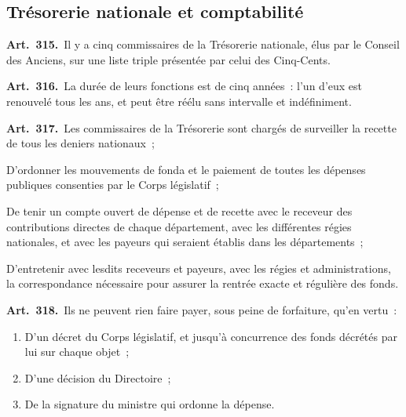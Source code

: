 \documentclass[french,twoside]{book} %
\newcommand{\labelchar}[1]{\textbf{\color{rubric} #1}}
\begin{document}
\subsection[{Trésorerie nationale et comptabilité}]{Trésorerie nationale et comptabilité}

\labelchar{Art. 315.} Il y a cinq commissaires de la Trésorerie nationale, élus par le Conseil des Anciens, sur une liste triple présentée par celui des Cinq-Cents.\par
\labelchar{Art. 316.} La durée de leurs fonctions est de cinq années : l’un d’eux est renouvelé tous les ans, et peut être réélu sans intervalle et indéfiniment.\par
\labelchar{Art. 317.} Les commissaires de la Trésorerie sont chargés de surveiller la recette de tous les deniers nationaux ;\par
D’ordonner les mouvements de fonda et le paiement de toutes les dépenses publiques consenties par le Corps législatif ;\par
De tenir un compte ouvert de dépense et de recette avec le receveur des contributions directes de chaque département, avec les différentes régies nationales, et avec les payeurs qui seraient établis dans les départements ;\par
D’entretenir avec lesdits receveurs et payeurs, avec les régies et administrations, la correspondance nécessaire pour assurer la rentrée exacte et régulière des fonds.\par
\labelchar{Art. 318.} Ils ne peuvent rien faire payer, sous peine de forfaiture, qu’en vertu :\par

\begin{enumerate}[itemsep=0pt,topsep=0pt,partopsep=0pt,parskip=0pt]
\item D’un décret du Corps législatif, et jusqu’à concurrence des fonds décrétés par lui sur chaque objet ;
\item D’une décision du Directoire ;
\item De la signature du ministre qui ordonne la dépense.
\end{enumerate}
\end{document}
